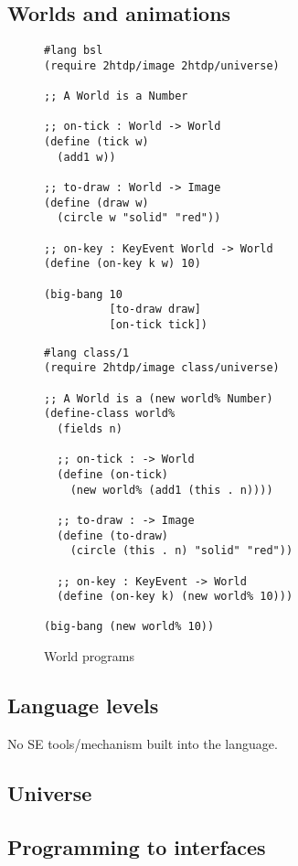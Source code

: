 \documentclass[submission,copyright]{eptcs}
\begin{document}
\subsection{Worlds and animations}


\begin{figure}
\begin{minipage}[t]{3.4in}
\begin{verbatim}
#lang bsl
(require 2htdp/image 2htdp/universe)

;; A World is a Number

;; on-tick : World -> World
(define (tick w)
  (add1 w))

;; to-draw : World -> Image
(define (draw w)
  (circle w "solid" "red"))

;; on-key : KeyEvent World -> World
(define (on-key k w) 10)

(big-bang 10
          [to-draw draw]
          [on-tick tick])
\end{verbatim}
\end{minipage}
\begin{minipage}[t]{3in}
\begin{verbatim}
#lang class/1
(require 2htdp/image class/universe)

;; A World is a (new world% Number)
(define-class world%
  (fields n)

  ;; on-tick : -> World
  (define (on-tick)
    (new world% (add1 (this . n))))

  ;; to-draw : -> Image
  (define (to-draw) 
    (circle (this . n) "solid" "red"))

  ;; on-key : KeyEvent -> World
  (define (on-key k) (new world% 10)))
  
(big-bang (new world% 10))
\end{verbatim}
\end{minipage}
\caption{World programs}
\label{fig:world}
\end{figure}


\subsection{Language levels}

No SE tools/mechanism built into the language.

\subsection{Universe}

\subsection{Programming to interfaces}
\end{document}
